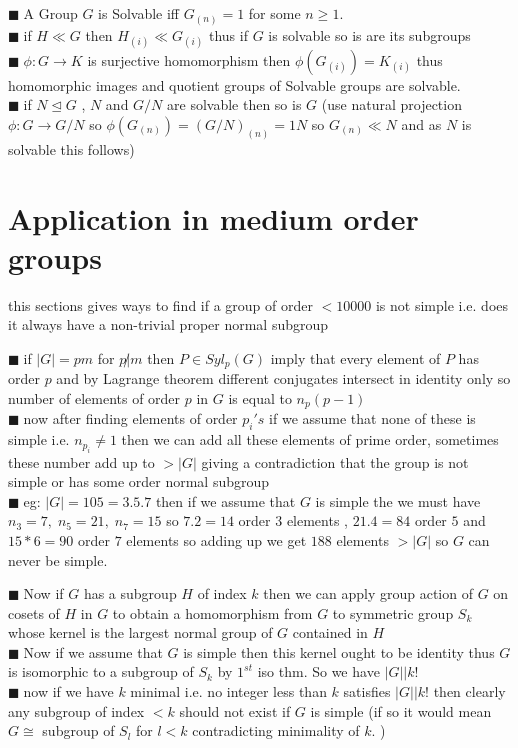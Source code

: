 \documentclass[11pt]{extarticle}
\newcommand{\ra}{\rightarrow}
\newcommand{\snote}[1]{{\footnotesize(#1)}}
\newcommand{\y}{$\blacksquare\;$}
\newcommand{\tbx}[2][]{
	\begin{tcolorbox}[enhanced,breakable,size=small,colback=black!2!white,title={#1},arc is angular, arc=1.5mm,drop fuzzy shadow]
		#2
	\end{tcolorbox}
}
\begin{document}
\begin{multicols}{2}
{	 \y A Group $ G $ is Solvable iff $ G_{(n)}=1 $ for some $ n\geq 1. $\\
	  \y  if $ H\ll G $ then $ H_{(i)} \ll G_{(i)}$ thus if $ G $ is solvable so is are its subgroups\\
	   \y $ \phi:G\ra K $ is surjective homomorphism then $ \phi(G_{(i)})=K_{(i)} $ thus homomorphic images and quotient groups of Solvable groups are solvable.\\
	  \y   if $ N\trianglelefteq G $ , $ N $ and $ G/N $ are solvable then so is $ G $ \snote{use natural projection $ \phi:G\ra G/N $ so $ \phi(G_{(n)}) =(G/N)_{(n)}= 1N$ so $ G_{(n)}\ll N $ and as $ N $ is solvable this follows}}
\section{Application in medium order groups}
\tbx{ this sections gives ways to find if a group of order $ <10000 $ is not simple i.e. does it always have a non-trivial proper normal subgroup }
\tbx[1. Counting elements]{
\y if $ |G|=pm$ for $ p\not| m $ then $ P\in Syl_p(G) $ imply that every element of $ P $ has order $ p $ and by Lagrange theorem different conjugates intersect in identity only so number of elements of order $ p $ in $ G $ is equal to $ n_p(p-1) $ \\
\y now after finding elements of order $ p_i's $ if  we assume that none of these is simple i.e. $ n_{p_i}\neq 1 $ then we can add all these elements of prime order, sometimes these number add up to $ >|G| $ giving a contradiction that the group is not simple or has some order normal subgroup \\
\y eg: $ |G|=105=3.5.7 $ then if we assume that $ G $ is simple the we must have $ n_3=7,\; n_5=21 ,\;  n_7=15$ so $ 7.2=14 $ order $ 3 $ elements , $ 21.4=84 $ order $ 5 $ and $ 15*6=90 $ order $ 7 $ elements so adding up we get $ 188 $ elements $ >|G| $ so $ G $ can never be simple. }
\tbx[2. Exploiting subgroups of small index]{
\y Now if $ G $ has a subgroup $ H $ of index $ k $ then we can apply group action of $ G $ on cosets of $ H $ in $ G $ to obtain a homomorphism from $ G $ to symmetric group $ S_k $ whose kernel is the largest normal group of $ G $ contained in $ H $ \\
\y Now if we assume that $ G $ is simple then this kernel ought to be identity thus $ G $ is isomorphic to a subgroup of $ S_k $ by $ 1^{st} $ iso thm. So we have $ |G||k! $\\
\y now if we have $ k $ minimal i.e. no integer less than $ k $ satisfies $ |G||k! $ then clearly any subgroup of index $ <k$ should not exist if $ G $ is simple \snote{if so it would mean $ G\cong  $ subgroup of $ S_l $ for $ l<k $ contradicting minimality of $ k.$  }\\
}
\end{multicols}
\end{document}
